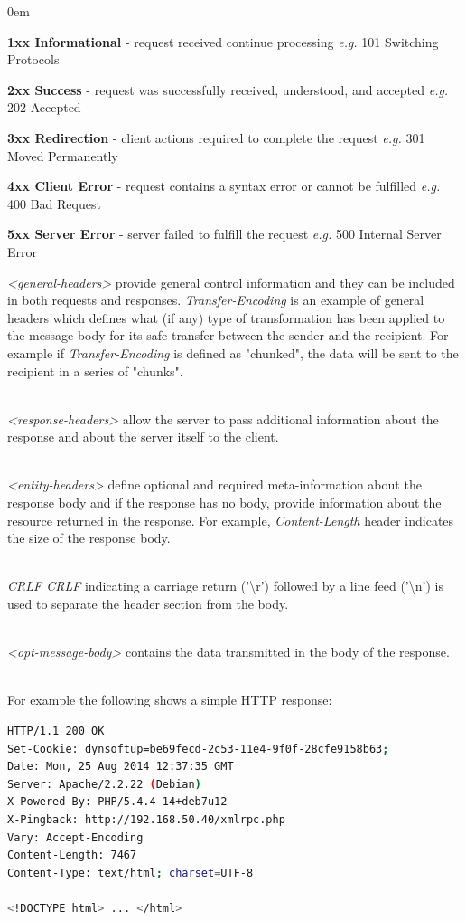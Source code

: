 \documentclass[a4paper,11pt,twoside]{article}
\begin{document}
\begin{list}{-}{}
\itemsep0em
\item \textbf{1xx Informational} - request received continue processing \textit{e.g.} 101 Switching Protocols
\item \textbf{2xx Success} - request was successfully received, understood, and accepted \textit{e.g.} 202 Accepted
\item \textbf{3xx Redirection} - client actions required to complete the request \textit{e.g.} 301 Moved Permanently
\item \textbf{4xx Client Error} - request contains a syntax error or cannot be fulfilled \textit{e.g.} 400 Bad Request
\item \textbf{5xx Server Error} - server failed to fulfill the request \textit{e.g.} 500 Internal Server Error
\end{list}
\noindent
\textit{<general-headers>} provide general control information and they can be included in both requests and responses. \textit{Transfer-Encoding} is an example of general headers which defines what (if any) type of transformation has been applied to the message body for its safe transfer between the sender and the recipient. For example if \textit{Transfer-Encoding} is defined as "chunked", the data will be sent to the recipient in a series of "chunks". 

\noindent\\
\textit{<response-headers>} allow the server to pass additional information about the response and about the server itself to the client. 

\noindent\\
\textit{<entity-headers>} define optional and required meta-information about the response body and if the response has no body, provide information about the resource returned in the response. For example, \textit{Content-Length} header indicates the size of the response body. 

\noindent\\
\textit{CRLF CRLF} indicating a carriage return ('\textbackslash r') followed by a line feed ('\textbackslash n') is used to separate the header section from the body. 

\noindent\\
\textit{<opt-message-body>} contains the data transmitted in the body of the response.

\noindent\\
For example the following shows a simple HTTP response:
\indent
\begin{lstlisting}[language=bash,xleftmargin=.25in,xrightmargin=.25in]
HTTP/1.1 200 OK
Set-Cookie: dynsoftup=be69fecd-2c53-11e4-9f0f-28cfe9158b63;
Date: Mon, 25 Aug 2014 12:37:35 GMT
Server: Apache/2.2.22 (Debian)
X-Powered-By: PHP/5.4.4-14+deb7u12
X-Pingback: http://192.168.50.40/xmlrpc.php
Vary: Accept-Encoding
Content-Length: 7467
Content-Type: text/html; charset=UTF-8

<!DOCTYPE html> ... </html>
\end{lstlisting} 
\end{document}
